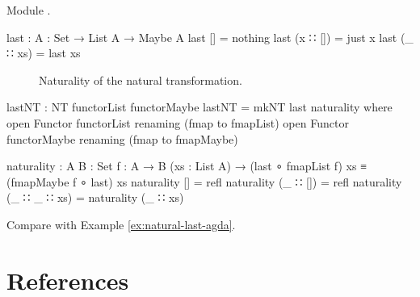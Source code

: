 \begin{example}
  \label{ex:natural-last-agda}

  Module .
  \begin{codeagda}
    last : {A : Set} → List A → Maybe A
    last []       = nothing
    last (x ∷ []) = just x
    last (_ ∷ xs) = last xs
  \end{codeagda}
  \begin{figure}[htbp]
    \begin{center}
    \end{center}
    \caption{Naturality of the  natural transformation.}
    \label{fig:naturality-agda-last}
  \end{figure}
  \begin{codeagda}
    lastNT : NT functorList functorMaybe
    lastNT = mkNT last naturality
      where
        open Functor functorList renaming (fmap to fmapList)
        open Functor functorMaybe renaming (fmap to fmapMaybe)

        naturality : {A B : Set} {f : A → B} (xs : List A) →
                     (last ∘ fmapList f) xs ≡ (fmapMaybe f ∘ last) xs
        naturality []           = refl
        naturality (_ ∷ [])     = refl
        naturality (_ ∷ _ ∷ xs) = naturality (_ ∷ xs)
  \end{codeagda}

  Compare with Example \ref{ex:natural-last-agda}.

\end{example}

\section{References}
\label{sec:naturals-references}


\clearemptydoublepage
